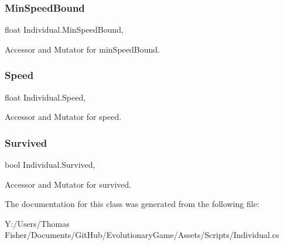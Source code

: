 \mbox{\label{class_individual_a78a3431b66eef67e58b6f4da5e1c8d63}} 
\subsubsection{\texorpdfstring{Min\+Speed\+Bound}{MinSpeedBound}}
{\footnotesize\ttfamily float Individual.\+Min\+Speed\+Bound\hspace{0.3cm}{\ttfamily [get]}, {\ttfamily [set]}}



Accessor and Mutator for min\+Speed\+Bound. 

\mbox{\label{class_individual_a02b01142acd16f32fd2faf1864b3627f}} 
\subsubsection{\texorpdfstring{Speed}{Speed}}
{\footnotesize\ttfamily float Individual.\+Speed\hspace{0.3cm}{\ttfamily [get]}, {\ttfamily [set]}}



Accessor and Mutator for speed. 

\mbox{\label{class_individual_ad4b03453693cb1ab8185c6a4335e86bd}} 
\subsubsection{\texorpdfstring{Survived}{Survived}}
{\footnotesize\ttfamily bool Individual.\+Survived\hspace{0.3cm}{\ttfamily [get]}, {\ttfamily [set]}}



Accessor and Mutator for survived. 



The documentation for this class was generated from the following file\+:\begin{DoxyCompactItemize}
\item 
Y\+:/\+Users/\+Thomas Fisher/\+Documents/\+Git\+Hub/\+Evolutionary\+Game/\+Assets/\+Scripts/Individual.\+cs\end{DoxyCompactItemize}
